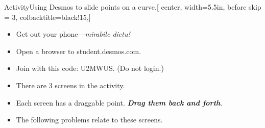 \begin{myAnnotate}{{Activity}}{Using {Desmos} to slide points on a curve.}[%
    center,
    width=5.5in,
    before skip = 3\baselineskip,
    colbacktitle=black!15,]
    \begin{itemize}[nosep]
        \item Get out your phone---{\itshape mirabile dictu!}
        \item Open a browser to {\ttfamily student.desmos.com}.
            \begin{center}
            \end{center}
        \item Join with this code: {\ttfamily U2MWUS}. (Do not login.)
        \item There are 3 screens in the activity. 
            \begin{center}
            \end{center}
        \item Each screen has a draggable point. 
            {\bfseries\itshape Drag them back and forth}.
        \item The following problems relate to these screens.
    \end{itemize}
\end{myAnnotate}

